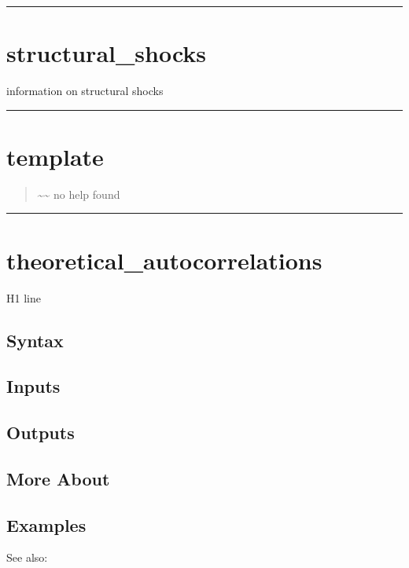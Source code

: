 \documentclass[letterpaper,10pt,english]{sphinxmanual}
\begin{document}
\bigskip\hrule{}\bigskip



\section{structural\_shocks}
\label{classes/models/@rfvar/rfvar:id172}\label{classes/models/@rfvar/rfvar:structural-shocks}
information on structural shocks


\bigskip\hrule{}\bigskip



\section{template}
\label{classes/models/@rfvar/rfvar:template}\label{classes/models/@rfvar/rfvar:id173}\begin{quote}

\textasciitilde{}\textasciitilde{} no help found
\end{quote}


\bigskip\hrule{}\bigskip



\section{theoretical\_autocorrelations}
\label{classes/models/@rfvar/rfvar:id174}\label{classes/models/@rfvar/rfvar:theoretical-autocorrelations}
H1 line


\subsection{Syntax}
\label{classes/models/@rfvar/rfvar:id175}

\subsection{Inputs}
\label{classes/models/@rfvar/rfvar:id176}

\subsection{Outputs}
\label{classes/models/@rfvar/rfvar:id177}

\subsection{More About}
\label{classes/models/@rfvar/rfvar:id178}

\subsection{Examples}
\label{classes/models/@rfvar/rfvar:id179}
See also:
\end{document}
